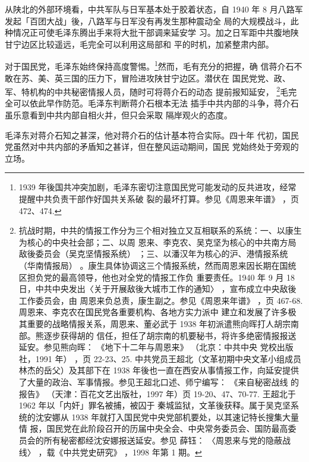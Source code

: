 从陕北的外部环境看，中共军队与日军基本处于胶着状态，自 1940
年 8 月八路军发起「百团大战」後，八路军与日军没有再发生那种震动全
局的大规模战斗，此种情况正可使毛泽东腾出手来将大批干部调来延安学
习。加之日军距中共腹地陕甘宁边区比较遥远，毛完全可以利用这局部和
平的时机，加紧整肃内部。

对于国民党，毛泽东始终保持高度警惕。\footnote{1939 年後国共冲突加剧，毛泽东密切注意国民党可能发动的反共进攻，经常提醒中共负责干部作好国共关系破
裂的最坏打算。参见《周恩来年谱》
，页 472、474. 
}然而，毛有充分的把握，确
信蒋介石不敢在苏、美、英三国的压力下，冒险进攻陕甘宁边区。潜伏在
国民党党、政、军、特机构的中共秘密情报人员，随时可将蒋介石的动态
提前报知延安， \footnote{抗战时期，中共的情报工作分为三个相对独立又互相联系的系统：一、以康生为核心的中央社会部；二、以周
恩来、李克农、吴克坚为核心的中共南方局敌後委员会（吴克坚情报系统）
；三、以潘汉年为核心的沪、港情报系统（华南情报局）
。康生具体协调这三个情报系统，然而周恩来因长期在国统区担负党的最高领导，他也对全党的情报工作负
重要责任。1940 年 9 月 18 日，中共中央发出〈关于开展敌後大城市工作的通知〉
，宣布成立中央敌後工作委员会，由
周恩来负总责，康生副之。参见《周恩来年谱》
，页 467-68. 周恩来、李克农在国民党各重要机构、各地方实力派中
建立和发展了许多极其重要的战略情报关系，周恩来、董必武于 1938 年初派遣熊向晖打人胡宗南部。熊逐步获得胡的
信任，担任了胡宗南的机要秘书，将许多绝密情报报送延安。参见熊向晖：
《地下十二年与周恩来》
（北京：中共中央
党校出版社，1991 年）
，页 22-23、25. 中共党员王超北（文革初期中央文革小组成员林杰的岳父）及其部下在 1938
年後也一直在西安从事情报工作，向延安提供了大量的政治、军事情报。参见王超北口述、师宁编写：
《来自秘密战线
的报告》
（天津：百花文艺出版社，1997 年）页 19-20、47、70-77. 王超北于 1962 年以「内奸」罪名被捕，被囚于
秦城监狱，文革後获释。属于吴克坚系统的沈安娜从 1938 年就打入国民党中央党部机要处，以其速记特长搜集大量情
报，国民党在此阶段召开的历届中央全会、中央常务委员会、国防最高委员会的所有秘密都经沈安娜报送延安。参见
薛钰：
〈周恩来与党的隐蔽战线〉
，载《中共党史研究》
，1998 年第 1 期。
}毛完全可以依此早作防范。毛泽东判断蒋介石根本无法
插手中共内部的斗争，蒋介石虽乐意看到中共内部自相火并，但只会采取
隔岸观火的态度。

毛泽东对蒋介石知之甚深，他对蒋介石的估计基本符合实际。四十年
代初，国民党虽然对中共内部的矛盾知之甚详，但在整风运动期间，国民
党始终处于旁观的立场。

